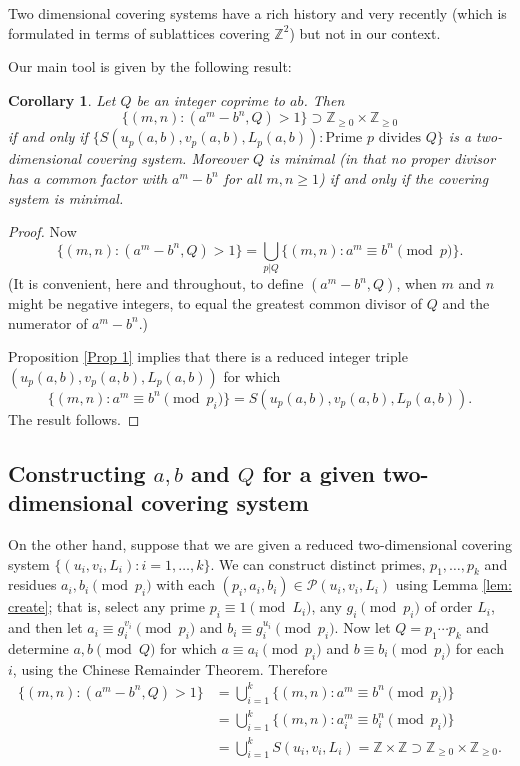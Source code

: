 \documentclass[12pt, a4paper,  reqno, english]{amsart}%
\numberwithin{equation}{section}
\newcommand{\Z}{\mathbb{Z}}
\newtheorem{corollary}{Corollary}
\theoremstyle{definition}
\renewcommand{\geq}{\geqslant}
\newcommand{\acom}[1]{{\color{red}{ #1}} }
\begin{document}
  Two dimensional covering systems have a rich history \cite{CM, JM, PS, Sc, Si}  and very recently \cite{CK} (which is formulated in terms of sublattices covering $\Z^2$)
 but not in our context.
 
Our main tool is given by the following result:
     
 \begin{corollary} Let $Q$ be an integer coprime to $ab$. Then
  \[
  \{ (m,n): (a^m-b^n,Q)>1\} \supset  \mathbb Z_{\geq 0}\times \mathbb Z_{\geq 0}
  \]
  if and only if  $\{ S(u_p(a,b), v_p(a,b), L_p(a,b)): \text{Prime } p \text{ divides } Q\}$ is a two-dimensional  covering system.
 Moreover $Q$ is minimal (in that no proper divisor has a common factor with $a^m-b^n$ for all $m,n\geq 1$) if and only if the covering system is minimal.
 \end{corollary}

\begin{proof}
Now
 \[
 \{ (m,n): (a^m-b^n,Q)>1\}  = \bigcup_{p|Q} \{ (m,n): a^m\equiv b^n \pmod {p}\}.
 \]
(It is convenient, here and throughout, to define $(a^m-b^n,Q)$, when $m$ and $n$ might be negative integers, to equal the greatest common divisor of $Q$ and the numerator of $a^m-b^n$.)

Proposition \ref{Prop 1} implies that there is a reduced integer triple $(u_p(a,b), v_p(a,b), L_p(a,b))$
 for which 
 \[
  \{ (m,n): a^m\equiv b^n \pmod {p_i}\} = S(u_p(a,b), v_p(a,b), L_p(a,b)).
  \]
The result follows.
\end{proof}
 
   
\subsection{Constructing $a,b$ and $Q$ for a given two-dimensional covering system}
   
   On the other hand, suppose that we are given a reduced two-dimensional covering system $\{ (u_i,v_i,L_i): i=1,\dots,k\}$. We can construct
   distinct primes, $p_1,\dots,p_k$ and residues $a_i, b_i \pmod {p_i}$ with each $(p_i,a_i,b_i)\in \mathcal P (u_i,v_i,L_i)$ using Lemma  \ref{lem: create}; that is, select any prime $p_i\equiv 1 \pmod{L_i}$, any $g_i  \pmod{p_i}$ of order $L_i$, and then let
$a_i\equiv g_i^{v_i} \pmod {p_i}$ and $b_i\equiv g_i^{u_i} \pmod {p_i}$. Now
 let $Q=p_1\cdots p_k$ and determine $a,b \pmod Q$ for which  $a\equiv a_i \pmod {p_i}$ and  $b\equiv b_i \pmod {p_i}$ for each $i$, using the Chinese Remainder Theorem. Therefore
 \begin{align*}
 \{ (m,n): (a^m-b^n,Q)>1\}  &= \bigcup_{i=1}^k \{ (m,n): a^m\equiv b^n \pmod {p_i}\}  \\ 
&= \bigcup_{i=1}^k \{ (m,n): a_i^m\equiv b_i^n \pmod {p_i}\}  \\ 
&= \bigcup_{i=1}^k S(u_i,v_i,L_i)=\Z \times \Z \supset \Z_{\geq 0} \times \Z_{\geq 0} .
  \end{align*}
\end{document}
